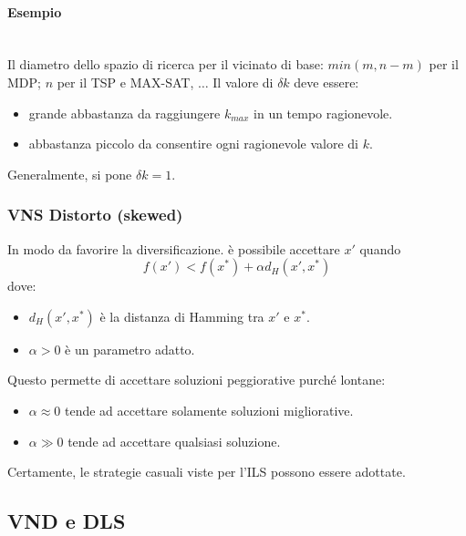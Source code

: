 \documentclass{article}
\begin{document}
\paragraph{Esempio}\mbox{}\\
Il diametro dello spazio di ricerca per il vicinato di base: $min(m,n-m)$ per il MDP;
$n$ per il TSP e MAX-SAT, $\dots$
Il valore di $\delta k$ deve essere:
\begin{itemize}
    \item grande abbastanza da raggiungere $k_{max}$ in un tempo ragionevole.
    \item abbastanza piccolo da consentire ogni ragionevole valore di $k$.
\end{itemize}
Generalmente, si pone $\delta k=1$.

\subsubsection{VNS Distorto (skewed)}
In modo da favorire la diversificazione. è possibile accettare $x'$ quando
$$f(x')<f(x^*)+\alpha d_H(x',x^*)$$
dove:
\begin{itemize}
    \item $d_H(x',x^*)$ è la distanza di Hamming tra $x'$ e $x^*$.
    \item $\alpha >0$ è un parametro adatto.
\end{itemize}
Questo permette di accettare soluzioni peggiorative purché lontane:
\begin{itemize}
    \item $\alpha\approx 0$ tende ad accettare solamente soluzioni migliorative.
    \item $\alpha\gg 0$ tende ad accettare qualsiasi soluzione.
\end{itemize}
Certamente, le strategie casuali viste per l'ILS possono essere adottate.

\subsection{VND e DLS}
\end{document}
